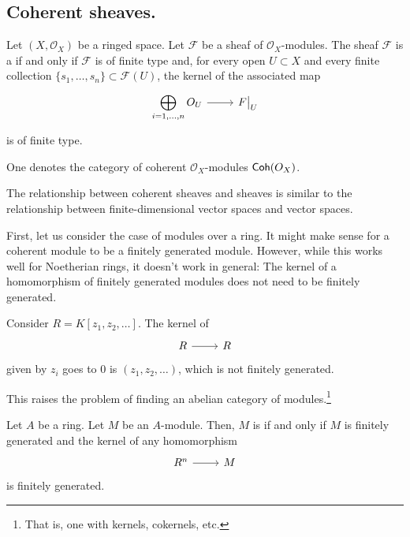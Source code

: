 \documentclass [11 pt, oneside] {article}
\begin{document}
\subsection{Coherent sheaves.}
\begin{definition}\label{cohs}\text{}
Let $(X,\mathscr{O}_X)$ be a ringed space. Let $\mathscr{F}$ be a sheaf of $\mathscr{O}_X$-modules. The sheaf $\mathscr{F}$ is a  if and only if $\mathscr{F}$ is of finite type and, for every open $U\subset X$ and every finite collection $\{s_1,\hdots,s_n\}\subset \mathscr{F}(U)$, the kernel of the associated map
\[
\begin{tikzcd}
\displaystyle \bigoplus_{i=1,\hdots, n}\mathscr{O}_U \ar[r]& \mathscr{F}\big |_U
\end{tikzcd}
\]
is of finite type.

One denotes the category of coherent $\mathscr{O}_X$-modules $\textsf{Coh}(\relax{O}_X)$.
\end{definition}

The relationship between coherent sheaves and sheaves is similar to the relationship between finite-dimensional vector spaces and vector spaces.

First, let us consider the case of modules over a ring. It might make sense for a coherent module to be a finitely generated module. However, while this works well for Noetherian rings, it doesn't work in general: The kernel of a homomorphism of finitely generated modules does not need to be finitely generated.

\begin{example}[ ]\label{}\text{}
Consider $R = K[z_1,z_2,\hdots]$. The kernel of 
\[
\begin{tikzcd}
R\ar[r]&R
\end{tikzcd}
\]
given by $z_i$ goes to $0$ is $(z_1,z_2,\hdots)$, which is not finitely generated.
\end{example}

This raises the problem of finding an abelian category of modules.\footnote{That is, one with kernels, cokernels, etc.}

\begin{definition}[ ]\label{}\text{}
Let $A$ be a ring. Let $M$ be an $A$-module. Then, $M$ is  if and only if $M$ is finitely generated and the kernel of any homomorphism 
\[
\begin{tikzcd}
R^n\ar[r]&M
\end{tikzcd}
\]
is finitely generated.
\end{definition}
\end{document}
